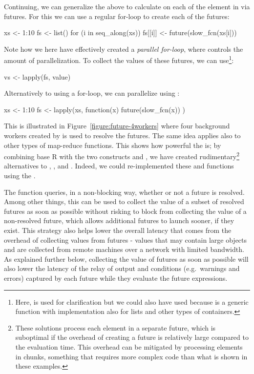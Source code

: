 Continuing, we can generalize the above to
calculate  on each of the element in  via
futures. For this we can use a regular for-loop to create each of
the  futures:
\begin{example}
xs <- 1:10
fs <- list()
for (i in seq_along(xs)) {
  fs[[i]] <- future(slow_fcn(xs[i]))
}
\end{example}
Note how we here have effectively created a \emph{parallel for-loop},
where  controls the amount of parallelization.  To
collect the values of these futures, we can
use\footnote{Here,  is used for
clarification but we could also have used 
because  is a generic function with implementation also
for lists and other types of containers.}:
\begin{example}
vs <- lapply(fs, value)
\end{example}
%
Alternatively to using a for-loop, we can parallelize
using :
\begin{example}
xs <- 1:10
fs <- lapply(xs, function(x) {
  future(slow_fcn(x))
})
\end{example}
%
This is illustrated in Figure~\ref{figure:future-4workers} where four
background workers created by 
is used to resolve the futures.
%
The same idea applies also to other types of map-reduce functions.
This shows how powerful the  is; by combining base R
with the two constructs  and , we have
created rudimentary\footnote{These solutions process each element in a
separate future, which is suboptimal if the overhead of creating a
future is relatively large compared to the evaluation time. This
overhead can be mitigated by processing elements in chunks, something
that requires more complex code than what is shown in these examples.}
alternatives to , , and
.  Indeed, we could re-implemented these
 and  functions using the .

The  function queries, in a non-blocking way, whether
or not a future is resolved.  Among other things, this can be used to
collect the value of a subset of resolved futures as soon as possible
without risking to block from collecting the value of a non-resolved
future, which allows additional futures to launch sooner, if they
exist.  This strategy also helps lower the overall latency that comes
from the overhead of collecting values from futures - values that may
contain large objects and are collected from remote machines over a
network with limited bandwidth.  As explained further below,
collecting the value of futures as soon as possible will also lower
the latency of the relay of output and conditions (e.g.\ warnings and
errors) captured by each future while they evaluate the future
expressions.

